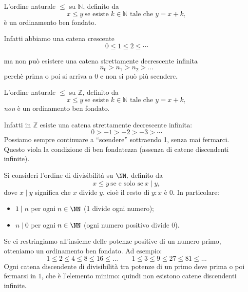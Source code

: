 
\begin{esempio}
     L'ordine naturale \(\leq\) su \(\mathbb{N}\), definito da
\[
x \leq y \ \text{se esiste } k \in \mathbb{N} \text{ tale che } y = x + k,
\]
è un ordinamento ben fondato.
\medskip 

\noindent Infatti abbiamo una catena crescente
  \[
  0 \leq 1 \leq 2 \leq \cdots
  \]

ma non può esistere una catena strettamente decrescente infinita
\[
 n_0 > n_1> n_2 > \ldots 
\]
perchè prima o poi si arriva a \(0\) e non si può più scendere.
\end{esempio}


\begin{esempio}
L'ordine naturale \(\leq\) su \(\mathbb{Z}\), definito da
\[
x \leq y \ \text{se esiste } k \in \mathbb{N} \text{ tale che } y = x + k,
\]
\emph{non} è un ordinamento ben fondato.

Infatti in \(\mathbb{Z}\) esiste una catena strettamente decrescente infinita:
\[
0 > -1 > -2 > -3 > \cdots
\]
Possiamo sempre continuare a “scendere” sottraendo 1, senza mai fermarci.
Questo viola la condizione di ben fondatezza (assenza di catene discendenti infinite).
\end{esempio}









\begin{esempio}
Si consideri l'ordine di divisibilità su $\NN$, definito da
\[
x \leq y \ \text{se e solo se}\ x \mid y,
\]
dove $x \mid y$ significa che $x$ divide $y$, cioè il resto di $y:x$ è $0$.
In particolare:
\begin{itemize}
    \item $1 \mid n$ per ogni $n \in \NN$ (1 divide ogni numero);
    \item $n \mid 0$ per ogni $n \in \NN$ (ogni numero positivo divide $0$).
\end{itemize}

Se ci restringiamo all’insieme delle potenze positive di un numero primo, otteniamo un ordinamento ben fondato.
Ad esempio:
\[
1\leq 2 \leq 4 \leq 8\leq 16 \leq \ldots 
\qquad
1 \leq 3 \leq 9 \leq 27 \leq 81 \leq \ldots
\]
Ogni catena discendente di divisibilità tra potenze di un primo deve prima o poi fermarsi in $1$, 
che è l’elemento minimo: quindi non esistono catene discendenti infinite.
\end{esempio}


